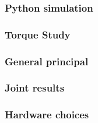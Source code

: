 \subsubsection{Python simulation}

\subsubsection{Torque Study}
\subsubsection{General principal}

\subsubsection{Joint results}

\subsubsection{Hardware choices}
